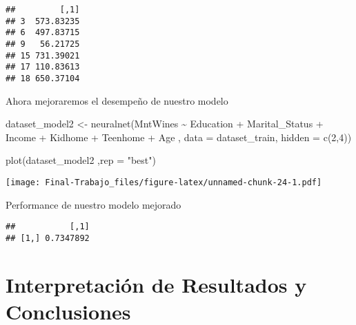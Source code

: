 \documentclass[Iberoamerican Journal of Industrial
Engineering,article,submit,moreauthors,pdftex]{Definitions/mdpi}
\newenvironment{Shaded}{\begin{snugshade}}{\end{snugshade}}
\newcommand{\AttributeTok}[1]{\textcolor[rgb]{0.77,0.63,0.00}{#1}}
\newcommand{\DecValTok}[1]{\textcolor[rgb]{0.00,0.00,0.81}{#1}}
\newcommand{\FunctionTok}[1]{\textcolor[rgb]{0.00,0.00,0.00}{#1}}
\newcommand{\NormalTok}[1]{#1}
\newcommand{\OtherTok}[1]{\textcolor[rgb]{0.56,0.35,0.01}{#1}}
\newcommand{\SpecialCharTok}[1]{\textcolor[rgb]{0.00,0.00,0.00}{#1}}
\newcommand{\StringTok}[1]{\textcolor[rgb]{0.31,0.60,0.02}{#1}}
\begin{document}
\begin{verbatim}
##         [,1]
## 3  573.83235
## 6  497.83715
## 9   56.21725
## 15 731.39021
## 17 110.83613
## 18 650.37104
\end{verbatim}

Ahora mejoraremos el desempeño de nuestro modelo

\begin{Shaded}
\begin{Highlighting}[]
\NormalTok{dataset\_model2 }\OtherTok{\textless{}{-}} \FunctionTok{neuralnet}\NormalTok{(MntWines }\SpecialCharTok{\textasciitilde{}}\NormalTok{ Education }\SpecialCharTok{+}\NormalTok{ Marital\_Status }\SpecialCharTok{+}\NormalTok{ Income }\SpecialCharTok{+}\NormalTok{ Kidhome }\SpecialCharTok{+}\NormalTok{ Teenhome }\SpecialCharTok{+}\NormalTok{ Age , }\AttributeTok{data =}\NormalTok{ dataset\_train, }\AttributeTok{hidden =} \FunctionTok{c}\NormalTok{(}\DecValTok{2}\NormalTok{,}\DecValTok{4}\NormalTok{))}

\FunctionTok{plot}\NormalTok{(dataset\_model2 ,}\AttributeTok{rep =} \StringTok{"best"}\NormalTok{)}
\end{Highlighting}
\end{Shaded}

\texttt{[image: Final-Trabajo\_files/figure-latex/unnamed-chunk-24-1.pdf]}

Performance de nuestro modelo mejorado

\begin{Shaded}
\end{Shaded}

\begin{verbatim}
##           [,1]
## [1,] 0.7347892
\end{verbatim}

\hypertarget{interpretaciuxf3n-de-resultados-y-conclusiones}{%
\section{Interpretación de Resultados y
Conclusiones}\label{interpretaciuxf3n-de-resultados-y-conclusiones}}
\end{document}
